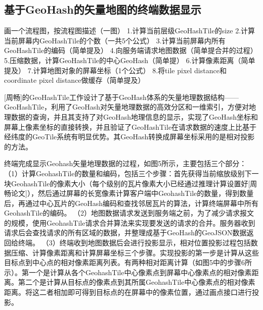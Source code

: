 \subsection{基于GeoHash的矢量地图的终端数据显示}
画一个流程图，按流程图描述（一图）
1.计算当前层级GeoHashTile的size
2.计算当前屏幕内GeoHashTile的个数（一共5个公式）
3.计算当前屏幕内所有GeoHashTile的编码（简单提及）
4.向服务端请求地图数据（简单提合并的过程）
5.压缩数据，计算GeoHashTile的中心GeoHash（简单提）
6.计算像素距离（简单提及）
7.计算地图对象的屏幕坐标（1个公式）
8.将tile pixel distance和coordinate pixel distance做缓存（简单提及）

[周畅]的GeoHashTile工作设计了基于GeoHash体系的矢量地理数据结构——GeoHashTile，利用了GeoHash对矢量地理数据的高效分区和一维索引，方便对地理数据的查询，并且其支持了对GeoHash地理信息的显示，实现了GeoHash坐标和屏幕上像素坐标的直接转换，并且验证了GeoHashTile在请求数据的速度上比基于经纬度的GeoTile系统有明显优势。其GeoHash转换成屏幕坐标采用的是相对投影的方法。

终端完成显示Geohash矢量地理数据的过程，如图5所示，主要包括三个部分：
（1）计算GeohashTile的数量和编码，包括三个步骤：首先获得当前缩放级别下一块GeohashTile的像素大小（每个级别的瓦片像素大小已经通过推理计算设置好[周畅论文]），然后通过屏幕的长宽像素计算客户端中GeohashTile的数量，得到数量后，再通过中心瓦片的GeoHash编码和查找邻居瓦片的算法，计算终端屏幕中所有GeohashTile的编码。
（2）地图数据请求发送到服务端之前，为了减少请求报文的规模，使用GeohashTile请求合并算法来实现要发送的请求的合并。服务器收到请求后会查找请求的所有区域的数据，并整理成基于GeoHash的GeoJSON数据返回给终端。
（3）终端收到地图数据后会进行投影显示，相对位置投影过程包括数据压缩、计算像素距离和计算屏幕坐标三个步骤。实现投影的第一步是计算从这些目标点到中心点的相对像素距离列表。有两种相对距离计算（如图5中的步骤6所示）。第一个是计算从各个GeohashTile中心像素点到屏幕中心像素点的相对像素距离。第二个是计算从目标点的像素点到其所属GeohashTile中心像素点的相对像素距离。将这二者相加即可得到目标点的在屏幕中的像素位置，通过画点接口进行投影。

